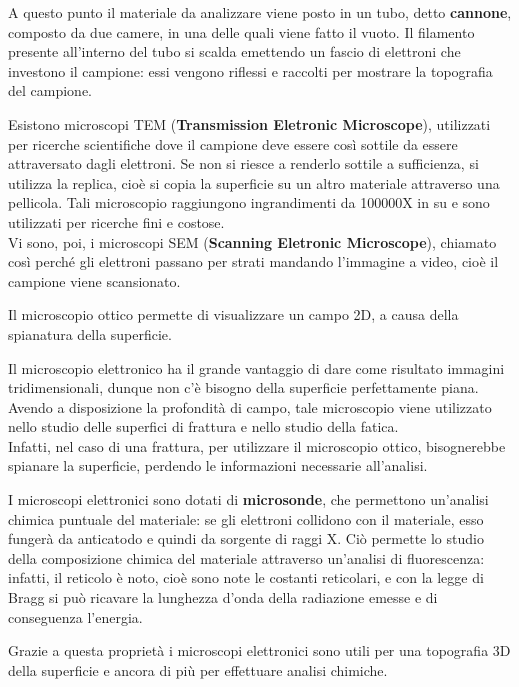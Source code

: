 A questo punto il materiale da analizzare viene posto in un tubo, detto \textbf{cannone}, composto da due camere, in una delle quali viene fatto il vuoto. Il filamento presente all’interno del tubo si scalda emettendo un fascio di elettroni che investono il campione: essi vengono riflessi e raccolti per mostrare la topografia del campione.

Esistono microscopi TEM (\textbf{Transmission Eletronic Microscope}), utilizzati per ricerche scientifiche dove il campione deve essere così sottile da essere attraversato dagli elettroni. Se non si riesce a renderlo sottile a sufficienza, si utilizza la replica, cioè si copia la superficie su un altro materiale attraverso una pellicola. Tali microscopio raggiungono ingrandimenti da 100000X in su e sono utilizzati per ricerche fini e costose.\\
Vi sono, poi, i microscopi SEM (\textbf{Scanning Eletronic Microscope}), chiamato così perché gli elettroni passano per strati mandando l’immagine a video, cioè il campione viene scansionato.

Il microscopio ottico permette di visualizzare un campo 2D, a causa della spianatura della superficie.

Il microscopio elettronico ha il grande vantaggio di dare come risultato immagini tridimensionali, dunque non c’è bisogno della superficie perfettamente piana. Avendo a disposizione la profondità di campo, tale microscopio viene utilizzato nello studio delle superfici di frattura e nello studio della fatica.\\
Infatti, nel caso di una frattura, per utilizzare il microscopio ottico, bisognerebbe spianare la superficie, perdendo le informazioni necessarie all’analisi.

I microscopi elettronici sono dotati di \textbf{microsonde}, che permettono un’analisi chimica
puntuale del materiale: se gli elettroni collidono con il materiale, esso fungerà da anticatodo e quindi da sorgente di raggi X. Ciò permette lo studio della composizione chimica del materiale attraverso un’analisi di fluorescenza: infatti, il reticolo è noto, cioè sono note le costanti reticolari, e con la legge di Bragg si può ricavare la lunghezza d’onda della radiazione emesse e di conseguenza l’energia.

Grazie a questa proprietà i microscopi elettronici sono utili per una topografia 3D della superficie e ancora di più per effettuare analisi chimiche.